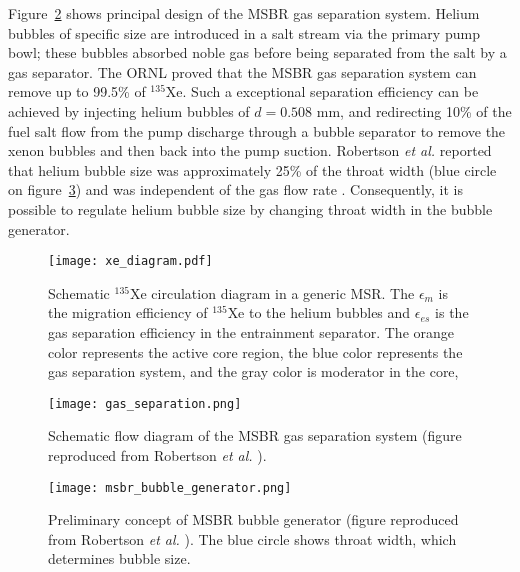 Figure~\ref{fig:gas_removal_system} shows principal design of the \gls{MSBR} 
gas separation system. Helium bubbles of specific size are introduced in a 
salt stream via the primary pump bowl; these bubbles absorbed noble gas 
before being separated from the salt by a gas separator. The \gls{ORNL} proved 
that the \gls{MSBR} gas separation system can remove up to 99.5\% of 
$^{135}$Xe. Such a exceptional separation efficiency can be achieved by 
injecting helium bubbles of $d=0.508$ mm, and redirecting 10\% of the fuel 
salt flow from the pump discharge through a bubble separator to remove the 
xenon bubbles and then back into the pump suction. Robertson \emph{et al.} 
reported that helium bubble size was approximately 25\% of the 
throat width (blue circle on figure~\ref{fig:bubble_separator}) and was 
independent of the gas flow rate \cite{robertson_conceptual_1971}. 
Consequently, it is possible to regulate helium bubble size by changing throat 
width in the bubble generator.
\begin{figure}[htp!] %
	\centering
	\texttt{[image: xe\_diagram.pdf]}
	\caption{Schematic $^{135}$Xe circulation diagram in a generic \gls{MSR}. 
	The $\epsilon_m$ is the migration efficiency of $^{135}$Xe to the helium 
	bubbles and $\epsilon_{es}$ is the gas separation efficiency in the 
	entrainment separator. The orange color represents the active core region, 
	the blue color represents the gas separation system, and the gray color is 
	moderator in the core,}
	\label{fig:xe_diagram}
\end{figure}
\begin{figure}[htp!] %
  \centering
  \texttt{[image: gas\_separation.png]}
  \caption{Schematic flow diagram of the \gls{MSBR} gas separation system 
  (figure reproduced from Robertson \emph{et al.} 
  \cite{robertson_conceptual_1971}).}
  \label{fig:gas_removal_system}
\end{figure}
\begin{figure}[t] %
  \centering
  \texttt{[image: msbr\_bubble\_generator.png]}
  \caption{Preliminary concept of \gls{MSBR} bubble generator (figure 
  reproduced from Robertson \emph{et al.} \cite{robertson_conceptual_1971}). 
  The blue circle shows 
  throat width, which determines bubble size.}
  \label{fig:bubble_separator}
\end{figure}
